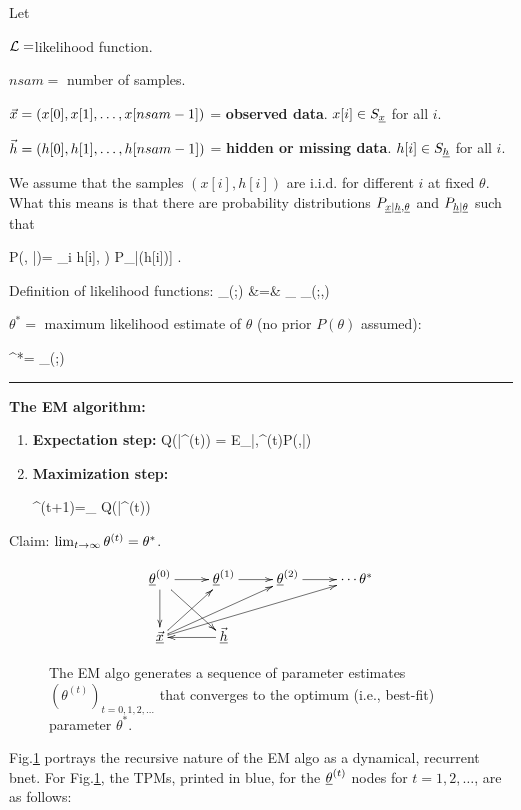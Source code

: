 Let
 
${\cal L}=$likelihood 
function.

$nsam=$ number of samples.

${\vec{x}}=(x[0], x[1], \ldots, x[nsam-1])$ =
{\bf observed data}.
 $x[i]\in S_{\underline{x}}$ for all $i$.

${\vec{h}}=(h[0], h[1], \ldots, h[nsam-1])$
= {\bf hidden or missing data}.
$h[i]\in S_{\underline{h}}$ for all $i$.

We assume that the samples $(x[i],h[i])$
are i.i.d. for different $i$ at fixed 
$\theta$.
What this means is that 
there are
probability distributions
$P_{{\underline{x}}|{\underline{h}},\underline{\theta}}$
and $P_{{\underline{h}}|\underline{\theta}}$
such that

\beq
P(\vecx, \vech|\theta)=
\prod_i \left[P_{\rvx|\rvh,\ul{\theta}}
(x[i]\cond h[i], \theta)
P_{\rvh|\ul{\theta}}(h[i]\cond \theta)\right]
\;.
\eeq

Definition of likelihood functions:
\beqa
{}
_{\call(\theta;\vecx)}
&=&
\sum_{\vech}
_{\call(\theta;\vecx,\vech)}
\eeqa


$\theta^*=$ maximum likelihood
estimate of $\theta$ (no prior $P(\theta)$
assumed):

\beq
\theta^*=
\argmax_\theta\call(\theta;\vecx)
\eeq

\hrule\noindent
{\bf The EM algorithm:}
\begin{enumerate}
\item{\bf Expectation step:} 
\beq
Q(\theta|\theta^{(t)})
=
E_{\vech|\vecx,\theta^{(t)}}\ln P(\vecx,\vech|\theta)
\label{eq-exp-step}
\eeq

\item{\bf Maximization step:}

\beq
\theta^{(t+1)}=\argmax_\theta
Q(\theta|\theta^{(t)})
\eeq
\end{enumerate}
Claim: $\lim_{t\rightarrow \infty}
\theta^{(t)}=\theta^*$.

\begin{figure}[h!]
$$\xymatrix{
\ul{\theta}^{(0)}\ar[d]\ar[dr]\ar[r]
&\ul{\theta}^{(1)}\ar[r]
&\ul{\theta}^{(2)}\ar[r]
&\cdots\theta^*
\\
\ul{\vecx}\ar[ru]\ar[rru]\ar[urrr]
&\ul{\vech}\ar[l]
}$$
\caption{
The EM algo generates 
a sequence of 
parameter estimates 
$(\theta^{(t)})_{t=0, 1,2, \ldots}$
that converges to the optimum (i.e., 
best-fit) parameter $\theta^*$.
}
\label{fig-emax-dynamical-bnet}
\end{figure}

Fig.\ref{fig-emax-dynamical-bnet}
portrays the 
recursive nature of 
the EM algo as a dynamical, recurrent bnet.
For Fig.\ref{fig-emax-dynamical-bnet},
the TPMs, printed in blue,
for the
$\underline{\theta}^{(t)}$
nodes for $t=1, 2, \ldots$, are
as follows:

